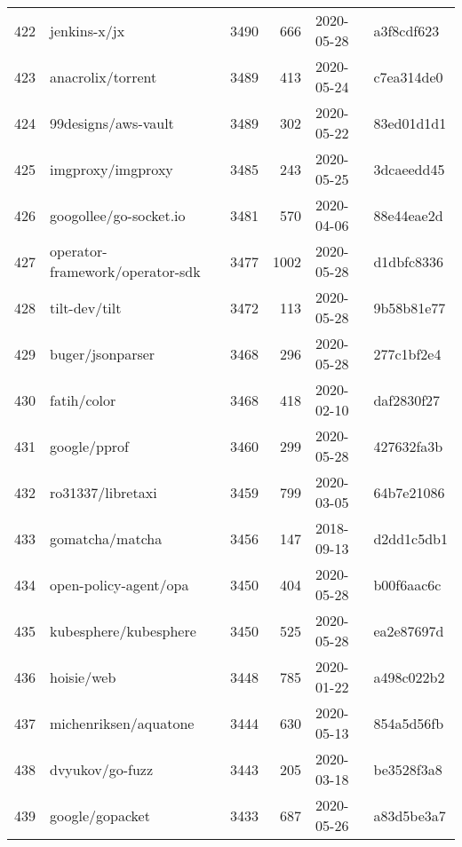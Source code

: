 \begin{longtable}{llrrll}
    422 &                                       jenkins-x/jx &   3490 &    666 & 2020-05-28 &  a3f8cdf623 \\
    423 &                                  anacrolix/torrent &   3489 &    413 & 2020-05-24 &  c7ea314de0 \\
    424 &                                99designs/aws-vault &   3489 &    302 & 2020-05-22 &  83ed01d1d1 \\
    425 &                                  imgproxy/imgproxy &   3485 &    243 & 2020-05-25 &  3dcaeedd45 \\
    426 &                             googollee/go-socket.io &   3481 &    570 & 2020-04-06 &  88e44eae2d \\
    427 &                    operator-framework/operator-sdk &   3477 &   1002 & 2020-05-28 &  d1dbfc8336 \\
    428 &                                      tilt-dev/tilt &   3472 &    113 & 2020-05-28 &  9b58b81e77 \\
    429 &                                   buger/jsonparser &   3468 &    296 & 2020-05-28 &  277c1bf2e4 \\
    430 &                                        fatih/color &   3468 &    418 & 2020-02-10 &  daf2830f27 \\
    431 &                                       google/pprof &   3460 &    299 & 2020-05-28 &  427632fa3b \\
    432 &                                  ro31337/libretaxi &   3459 &    799 & 2020-03-05 &  64b7e21086 \\
    433 &                                    gomatcha/matcha &   3456 &    147 & 2018-09-13 &  d2dd1c5db1 \\
    434 &                              open-policy-agent/opa &   3450 &    404 & 2020-05-28 &  b00f6aac6c \\
    435 &                              kubesphere/kubesphere &   3450 &    525 & 2020-05-28 &  ea2e87697d \\
    436 &                                         hoisie/web &   3448 &    785 & 2020-01-22 &  a498c022b2 \\
    437 &                              michenriksen/aquatone &   3444 &    630 & 2020-05-13 &  854a5d56fb \\
    438 &                                    dvyukov/go-fuzz &   3443 &    205 & 2020-03-18 &  be3528f3a8 \\
    439 &                                    google/gopacket &   3433 &    687 & 2020-05-26 &  a83d5be3a7 \\

\end{longtable}

